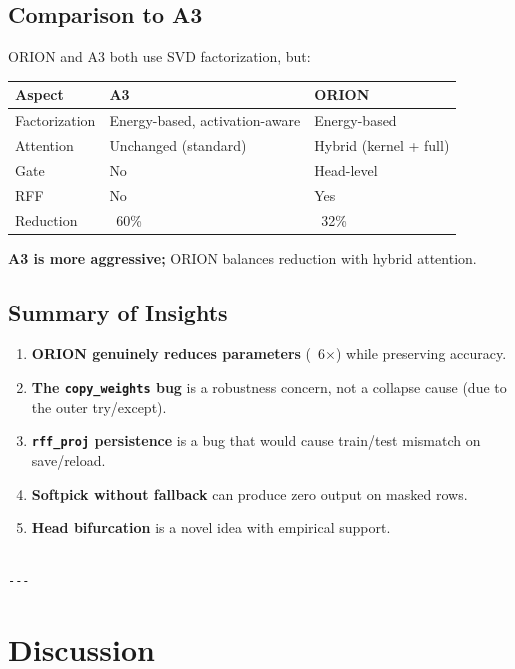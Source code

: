 \subsection{Comparison to A3}

ORION and A3 both use SVD factorization, but:

\begin{table}[H]
\centering
\small
\begin{tabular}{lll}
\toprule
\textbf{Aspect} & \textbf{A3} & \textbf{ORION} \\
\midrule
Factorization & Energy-based, activation-aware & Energy-based \\
Attention & Unchanged (standard) & Hybrid (kernel + full) \\
Gate & No & Head-level \\
RFF & No & Yes \\
Reduction & ~60\% & ~32\% \\
\bottomrule
\end{tabular}
\end{table}

\textbf{A3 is more aggressive;} ORION balances reduction with hybrid attention.

\subsection{Summary of Insights}

\begin{enumerate}
\item \textbf{ORION genuinely reduces parameters} (~6$\times$) while preserving accuracy.
\item \textbf{The \texttt{copy\_weights} bug} is a robustness concern, not a collapse
  cause (due to the outer try/except).
\item \textbf{\texttt{rff\_proj} persistence} is a bug that would cause train/test
  mismatch on save/reload.
\item \textbf{Softpick without fallback} can produce zero output on masked rows.
\item \textbf{Head bifurcation} is a novel idea with empirical support.
\end{enumerate}
\begin{lstlisting}

---
\end{lstlisting}


\section{Discussion}

